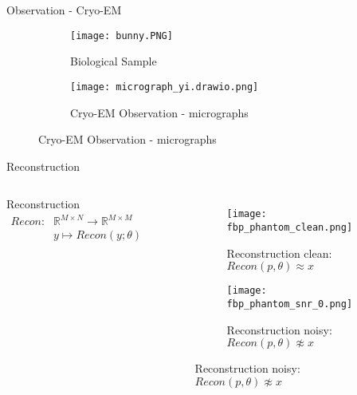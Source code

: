 \begin{frame}{Observation - Cryo-EM }

    \begin{figure}
        \centering
        \begin{subfigure}[t]{0.4\textwidth}
            \texttt{[image: bunny.PNG]}
            \caption{Biological Sample}
        \end{subfigure}
        \begin{subfigure}[t]{0.4\textwidth}
            \texttt{[image: micrograph\_yi.drawio.png]}
            \caption{Cryo-EM Observation - micrographs}
        \end{subfigure}
    \end{figure}

\end{frame}



\begin{frame}{Reconstruction}

    \begin{columns}
        \begin{block}{Reconstruction}
            \begin{equation}
                \begin{aligned}
                    \textit{Recon} : & \mathbb{R}^{M \times N} \to \mathbb{R}^{M \times M} \\
                    & y \mapsto Recon(y; \theta)
                \end{aligned}
            \end{equation}
        \end{block}

            
        \begin{figure}
            \centering
            \begin{subfigure}[t]{0.45\textwidth}
                \texttt{[image: fbp\_phantom\_clean.png]}
                \caption{Reconstruction clean: \\
                    $Recon(p, \theta) \approx x$}
            \end{subfigure}
            \begin{subfigure}[t]{0.45\textwidth}
                \texttt{[image: fbp\_phantom\_snr\_0.png]}
                \caption{Reconstruction noisy: \\
                    $Recon(p, \theta) \not\approx x$}
            \end{subfigure}
        \end{figure}

    \end{columns}

\end{frame}

